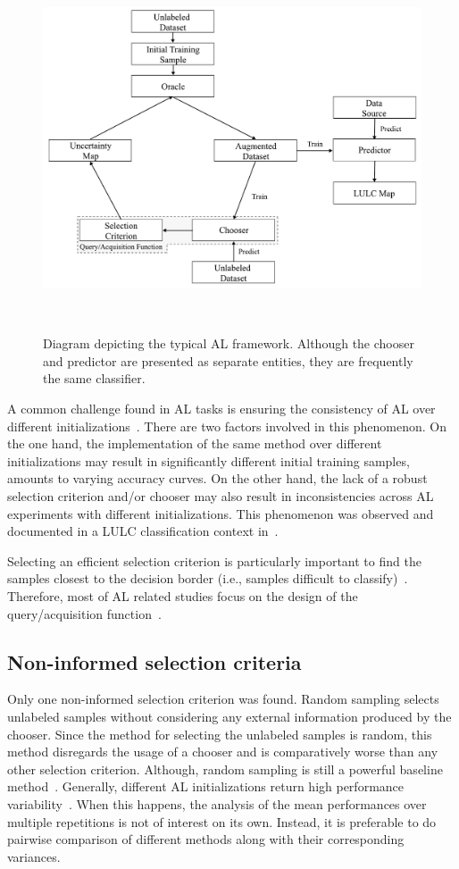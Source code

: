 \documentclass[parskip=full]{scrartcl}
\begin{document}
\begin{figure}[htb]
	\centering
	\includegraphics[width=.85\linewidth]{../analysis/al_typical}
	\caption{Diagram depicting the typical AL framework. Although the chooser
        and predictor are presented as separate entities, they are frequently
        the same classifier.
    }~\label{fig:al_typical}
\end{figure}

A common challenge found in AL tasks is ensuring the consistency of AL over
different initializations~\cite{Kottke2017}. There are two factors involved in
this phenomenon. On the one hand, the implementation of the same method over
different initializations may result in significantly different initial
training samples, amounts to varying accuracy curves. On the other hand, the
lack of a robust selection criterion and/or chooser may also result in
inconsistencies across AL experiments with different initializations. This
phenomenon was observed and documented in a LULC classification context
in~\cite{tuia2011using}.

Selecting an efficient selection criterion is particularly important to find
the samples closest to the decision border (i.e., samples difficult to
classify)~\cite{Shrivastava2021}. Therefore, most of AL related studies focus
on the design of the query/acquisition function~\cite{Su2020}.

\subsection{Non-informed selection criteria}

Only one non-informed selection criterion was found. Random sampling selects
unlabeled samples without considering any external information produced by the
chooser. Since the method for selecting the unlabeled samples is random, this
method disregards the usage of a chooser and is comparatively worse than any
other selection criterion. Although, random sampling is still a powerful
baseline method~\cite{Cawley2011}. Generally, different AL initializations
return high performance variability~\cite{Kottke2017}. When this happens, the
analysis of the mean performances over multiple repetitions is not of interest
on its own. Instead, it is preferable to do pairwise comparison of different
methods along with their corresponding variances. 
\end{document}
